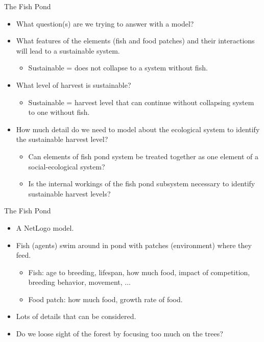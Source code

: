 \begin{frame}{The Fish Pond}
	\begin{itemize}
		\item What question(s) are we trying to answer with a model?
		\item What features of the elements (fish and food patches) and their interactions will lead to a sustainable system.
		\begin{itemize}
			\item Sustainable = does not collapse to a system without fish.
		\end{itemize}
		\item What level of harvest is sustainable?
		\begin{itemize}
			\item Sustainable = harvest level that can continue without collapsing system to one without fish.
		\end{itemize}
		\item How much detail do we need to model about the ecological system to identify the sustainable harvest level?
		\begin{itemize}
			\item Can elements of fish pond system be treated together as one element of a social-ecological system?
			\item Is the internal workings of the fish pond subsystem necessary to identify sustainable harvest levels?
		\end{itemize}
	\end{itemize}
\end{frame}

\begin{frame}{The Fish Pond}
	\begin{itemize}
		\item A NetLogo model.
		\item Fish (agents) swim around in pond with patches (environment) where they feed.
		\begin{itemize}
			\item Fish: age to breeding, lifespan, how much food, impact of competition, breeding behavior, movement, ...
			\item Food patch: how much food, growth rate of food.
		\end{itemize}
		\item Lots of details that can be considered.
		\item Do we loose sight of the forest by focusing too much on the trees?
	\end{itemize}
\end{frame}

